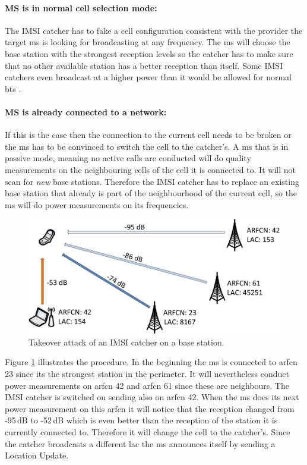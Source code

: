 \paragraph{MS is in normal cell selection mode:}
The IMSI catcher has to fake a cell configuration consistent with the provider the target \gls{ms} is looking for broadcasting at any frequency.
The \gls{ms} will choose the base station with the strongest reception levels so the catcher has to make sure that no other available station has a better reception than itself.
Some IMSI catchers even broadcast at a higher power than it would be allowed for normal \gls{bts} \cite{imsi_wiki}.

\paragraph{MS is already connected to a network:}
If this is the case then the connection to the current cell needs to be broken or the \gls{ms} has to be convinced to switch the cell to the catcher's.
A \gls{ms} that is in passive mode, meaning no active calls are conducted will do quality measurements on the neighbouring cells of the cell it is connected to.
It will not scan for \emph{new} base stations.
Therefore the IMSI catcher has to replace an existing base station that already is part of the neighbourhood of the current cell, so the \gls{ms} will do power measurements on its frequencies.
\begin{figure}
\centering
\includegraphics{../Images/replace_attack}
\caption{Takeover attack of an IMSI catcher on a base station.}
\label{fig:takeover_attack}
\end{figure}
Figure \ref{fig:takeover_attack} illustrates the procedure.
In the beginning the \gls{ms} is connected to \gls{arfcn} 23 since its the strongest station in the perimeter.
It will nevertheless conduct power measurements on \gls{arfcn} 42 and \gls{arfcn} 61 since these are neighbours.
The IMSI catcher is switched on sending also on \gls{arfcn} 42.
When the \gls{ms} does its next power measurement on this \gls{arfcn} it will notice that the reception changed from -95\,dB to -52\,dB which is even better than the reception of the station it is currently connected to.
Therefore it will change the cell to the catcher's.
Since the catcher broadcasts a different \gls{lac} the \gls{ms} announces itself by sending a Location Update.


